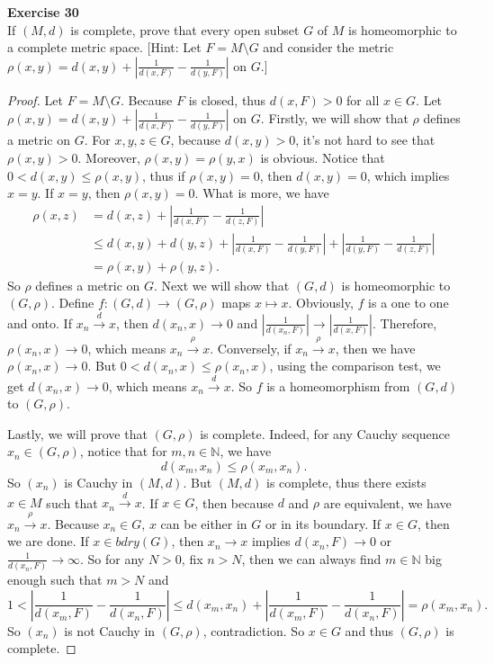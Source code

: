 \documentclass[12pt, a4paper]{article}
\theoremstyle{plain}
\newcommand{\N}{\mathbb{N}}
\newenvironment{exercise}[2][Exercise]
    { \begin{mdframed}[backgroundcolor=gray!20] \textbf{#1 #2} \\}
    {  \end{mdframed}}
\begin{document}
\pagebreak

\begin{exercise}{30}
If $(M,d)$ is complete, prove that every open subset $G$ of $M$ is homeomorphic to a complete metric space. [Hint: Let $F=M\setminus G$ and consider the metric $\rho(x,y)=d(x,y)+\left|\frac{1}{d(x,F)}-\frac{1}{d(y,F)}\right|$ on $G$.]
\end{exercise}
	\begin{proof}
	Let $F=M\setminus G$. Because $F$ is closed, thus $d(x,F)>0$ for all $x\in G$. Let $\rho(x,y)=d(x,y)+\left|\frac{1}{d(x,F)}-\frac{1}{d(y,F)}\right|$ on $G$. Firstly, we will show that $\rho$ defines a metric on $G$. For $x,y,z\in G$, because $d(x,y)>0$, it's not hard to see that $\rho(x,y)>0$. Moreover, $\rho (x,y)=\rho (y,x)$ is obvious. Notice that $0<d(x,y)\leq \rho(x,y)$, thus if $\rho(x,y)=0$, then $d(x,y)=0$, which implies $x=y$. If $x=y$, then $\rho(x,y)=0$. What is more, we have
	\begin{align*}
	\rho(x,z)&=d(x,z)+\left|\frac{1}{d(x,F)}-\frac{1}{d(z,F)}\right|\\
	&\leq d(x,y)+d(y,z)+\left|\frac{1}{d(x,F)}-\frac{1}{d(y,F)}\right|+\left|\frac{1}{d(y,F)}-\frac{1}{d(z,F)}\right|\\
	&=\rho (x,y)+\rho(y,z).
	\end{align*}
	So $\rho$ defines a metric on $G$. Next we will show that $(G,d)$ is homeomorphic to $(G,\rho)$. Define $f:(G,d)\rightarrow (G,\rho)$ maps $x\mapsto x$. Obviously, $f$ is a one to one and onto. If $x_n\xrightarrow{d} x$, then $d(x_n,x)\rightarrow 0$ and $\left|\frac{1}{d(x_n,F)}\right|\rightarrow \left|\frac{1}{d(x,F)}\right|$. Therefore, $\rho(x_n,x)\rightarrow 0$, which means $x_n\xrightarrow{\rho}x$. Conversely, if $x_n\xrightarrow{\rho}x$, then we have $\rho(x_n,x)\rightarrow 0$. But $0<d(x_n,x)\leq \rho(x_n,x)$, using the comparison test, we get $d(x_n,x)\rightarrow 0$, which means $x_n\xrightarrow{d}x$. So $f$ is a homeomorphism from $(G,d)$ to $(G,\rho)$. 
	
	Lastly, we will prove that $(G,\rho)$ is complete. Indeed, for any Cauchy sequence $x_n\in (G,\rho)$, notice that for $m,n\in\N$, we have
	\[
	d(x_m,x_n)\leq \rho(x_m,x_n).
	\]
	So $(x_n)$ is Cauchy in $(M,d)$. But $(M,d)$ is complete, thus there exists $x\in M$ such that $x_n\xrightarrow{d} x$. If $x\in G$, then because $d$ and $\rho$ are equivalent, we have $x_n\xrightarrow{\rho}x$. Because $x_n\in G$, $x$ can be either in $G$ or in its boundary. If $x\in G$, then we are done. If $x\in bdry(G)$, then $x_n\rightarrow x$ implies $d(x_n,F)\rightarrow 0$ or $\frac{1}{d(x_n,F)}\rightarrow\infty$. So for any $N>0$, fix $n>N$, then we can always find $m\in \N$ big enough such that $m>N$ and
	\[
	1<\left|\frac{1}{d(x_m,F)}-\frac{1}{d(x_n,F)}\right|\leq d(x_m,x_n)+\left|\frac{1}{d(x_m,F)}-\frac{1}{d(x_n,F)}\right|=\rho(x_m,x_n).
	\]
	So $(x_n)$ is not Cauchy in $(G,\rho)$, contradiction. So $x\in G$ and thus $(G,\rho)$ is complete.
	\end{proof}
\end{document}

